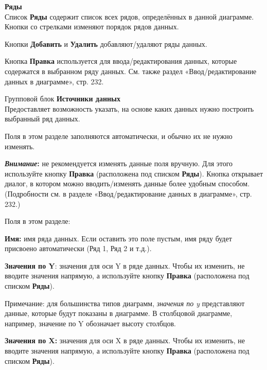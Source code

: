 \documentclass[a4paper,10pt]{article}
\newenvironment{myindentpar}[1]%
 {\begin{list}{}%
         {\setlength{\leftmargin}{#1}}%
         \item[]%
 }
 {\end{list}}
\begin{document}
\begin{itemize}
 \item \textbf{Ряды}\\
 Список \textbf{Ряды} содержит список всех рядов, определённых в данной диаграмме.\\
 Кнопки со стрелками изменяют порядок рядов данных.
 
 Кнопки \textbf{Добавить} и \textbf{Удалить} добавляют/удаляют ряды данных.
 
 Кнопка \textbf{Правка} используется для ввода/редактирования данных, которые содержатся в выбранном ряду данных. См. также раздел «Ввод/редактирование данных в диаграмме», стр. 232.
 \item Групповой блок \textbf{Источники данных}\\
 Предоставляет возможность указать, на основе каких данных нужно построить выбранный ряд данных.
 
 Поля в этом разделе заполняются автоматически, и обычно их не нужно изменять.
 
 \begin{mdframed}[backgroundcolor=blue!10]
\textbf{\textit{Внимание}:} не рекомендуется изменять данные поля вручную. Для этого используйте кнопку \textbf{Правка} (расположена под списком \textbf{Ряды}). Кнопка открывает диалог, в котором можно вводить/изменять данные более удобным способом. (Подробности см. в разделе «Ввод/редактирование данных в диаграмме», стр. 232.)
\end{mdframed}

Поля в этом разделе:

\textbf{Имя:} имя ряда данных. Если оставить это поле пустым, имя ряду будет присвоено автоматически (Ряд 1, Ряд 2 и т.д.).

\textbf{Значения по Y}: значения для оси Y в ряде данных. Чтобы их изменить, не вводите значения напрямую, а используйте кнопку \textbf{Правка} (расположена под списком \textbf{Ряды}).

\begin{myindentpar}{1cm}
 Примечание: для большинства типов диаграмм, \textit{значения по y} представляют данные, которые будут показаны в диаграмме. В столбцовой диаграмме, например, значение по Y обозначает высоту столбцов.
\end{myindentpar}

\textbf{Значения по X:} значения для оси X в ряде данных. Чтобы их изменить, не вводите значения напрямую, а используйте кнопку \textbf{Правка} (расположена под списком \textbf{Ряды}).


\end{itemize}
\end{document}
